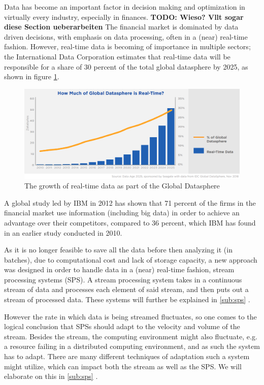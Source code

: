 Data has become an important factor in decision making and optimization in virtually every industry, especially in finances. \textbf{TODO: Wieso? Vllt sogar diese Section ueberarbeiten}
The financial market is dominated by data driven decisions, with emphasis on data processing, often in a (near) real-time fashion.
However, real-time data is becoming of importance in multiple sectors; the International Data Corporation estimates that real-time data will be 
responsible for a share of 30 percent of the total global datasphere by 2025, as shown in figure \ref{fig:growth_realtime_data}.
\begin{figure}[h]
\centering
\includegraphics[width=1.0\textwidth]{Bilder/realtime_data.png}
\caption{The growth of real-time data as part of the Global Datasphere \cite[p.13]{idc-seagate-data}}
\label{fig:growth_realtime_data}
\end{figure}

A global study led by IBM in 2012 has shown that 71 percent of the firms in the financial market use information (including big data)
in order to achieve an advantage over their competitors, compared to 36 percent, which IBM has found in an earlier study conducted in 2010. \cite[p.1]{ibm-financial}

As it is no longer feasible to save all the data before then analyzing it (in batches), due to computational cost and lack of storage capacity, 
a new approach was designed in order to handle data in a (near) real-time fashion, stream processing systems (SPS). 
A stream processing system takes in a continuous stream of data and processes each element of said stream, and then puts out a stream of processed data.
These systems will further be explained in \ref{sub:sps} .

However the rate in which data is being streamed fluctuates, so one comes to the logical conclusion that SPSs should adapt to the velocity and volume of the stream.
Besides the stream, the computing environment might also fluctuate, e.g. a resource failing in a distributed computing environment, 
and as such the system has to adapt. There are many different techniques of adaptation such a system might utilize, 
which can impact both the stream as well as the SPS. We will elaborate on this in \ref{sub:sps} .

